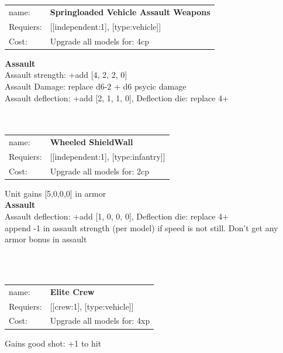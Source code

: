 \ \\
\ \\
\begin{tabular}{ll}
name: & {\bf Springloaded Vehicle Assault Weapons } \\
Requiers: & [[independent:1], [type:vehicle]] \\
Cost: & Upgrade all models for: 4cp \\
\end{tabular}





{\bf Assault} \ \\
Assault strength: +add [4, 2, 2, 0] 
\\ 
Assault Damage: replace d6-2 + d6 psycic damage
\\ 
Assault deflection: +add [2, 1, 1, 0], Deflection die: replace 4+
\\ 




\ \\
\ \\
\begin{tabular}{ll}
name: & {\bf Wheeled ShieldWall } \\
Requiers: & [[independent:1], [type:infantry]] \\
Cost: & Upgrade all models for: 2cp \\
\end{tabular}

Unit gains [5,0,0,0] in armor\\ 




{\bf Assault} \ \\
Assault deflection: +add [1, 0, 0, 0], Deflection die: replace 4+
\\ 

append -1 in assault strength (per model) if speed is not still. Don't get any armor bonus in assault


\ \\
\ \\
\begin{tabular}{ll}
name: & {\bf Elite Crew } \\
Requiers: & [[crew:1], [type:vehicle]] \\
Cost: & Upgrade all models for: 4xp \\
\end{tabular}

Gains good shot: +1 to hit\\ 









